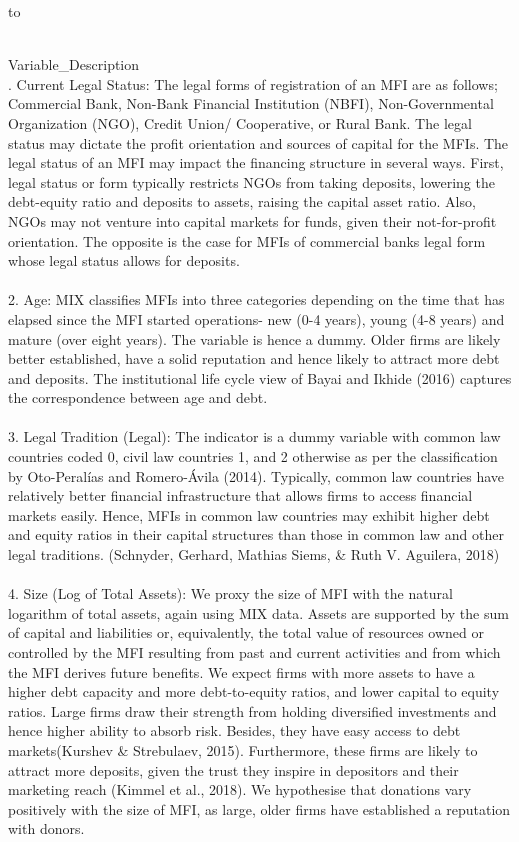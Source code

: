 \documentclass[
]{article}
\begin{document}
\begin{longtabu} to 
\caption{\label{tab:unnamed-chunk-19}Description of Independent Variables}\\
\toprule
Variable\_Description\\
. Current Legal Status: The legal forms of registration of an MFI are as follows; Commercial Bank, Non-Bank Financial Institution (NBFI), Non-Governmental Organization (NGO), Credit Union/ Cooperative, or Rural Bank. The legal status may dictate the profit orientation and sources of capital for the MFIs. The legal status of an MFI may impact the financing structure in several ways. First, legal status or form typically restricts NGOs from taking deposits, lowering the debt-equity ratio and deposits to assets, raising the capital asset ratio. Also, NGOs may not venture into capital markets for funds, given their not-for-profit orientation. The opposite is the case for MFIs of commercial banks legal form whose legal status allows for deposits.\\
\\
2.  Age: MIX classifies MFIs into three categories depending on the time that has elapsed since the MFI started operations- new (0-4 years), young (4-8 years) and mature (over eight years). The variable is hence a dummy. Older firms are likely better established, have a solid reputation and hence likely to attract more debt and deposits. The institutional life cycle view of Bayai and Ikhide (2016) captures the correspondence between age and debt.\\
\\
3. Legal Tradition (Legal): The indicator is a dummy variable with common law countries coded 0, civil law countries 1, and 2 otherwise as per the classification by Oto-Peralías and Romero-Ávila (2014). Typically, common law countries have relatively better financial infrastructure that allows firms to access financial markets easily. Hence, MFIs in common law countries may exhibit higher debt and equity ratios in their capital structures than those in common law and other legal traditions. (Schnyder, Gerhard, Mathias Siems, \& Ruth V. Aguilera, 2018)\\
\addlinespace
\\
4. Size (Log of Total Assets): We proxy the size of MFI with the natural logarithm of total assets, again using MIX data. Assets are supported by the sum of capital and liabilities or, equivalently, the total value of resources owned or controlled by the MFI resulting from past and current activities and from which the MFI derives future benefits. We expect firms with more assets to have a higher debt capacity and more debt-to-equity ratios, and lower capital to equity ratios. Large firms draw their strength from holding diversified investments and hence higher ability to absorb risk. Besides, they have easy access to debt markets(Kurshev \& Strebulaev, 2015). Furthermore, these firms are likely to attract more deposits, given the trust they inspire in depositors and their marketing reach (Kimmel et al., 2018). We hypothesise that donations vary positively with the size of MFI, as large, older firms have established a reputation with donors.\\

\end{longtabu}
\end{document}
